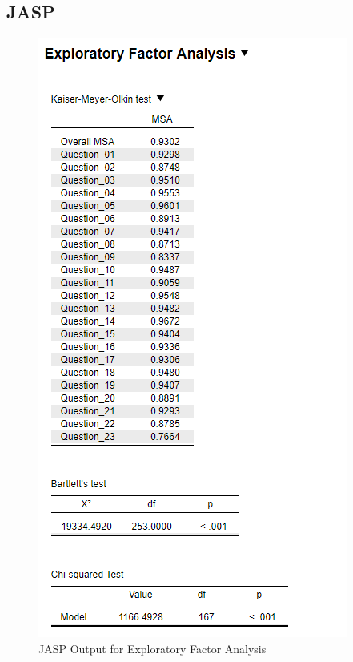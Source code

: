 \documentclass[
]{book}
\begin{document}
\hypertarget{jasp-1}{%
\subsection{JASP}\label{jasp-1}}

\begin{figure}[!h]
\includegraphics{Screenshots/Exploratory Factor Analysis/efaJASP1} \caption{\label{fig:efaJASP}JASP Output for Exploratory Factor Analysis}\label{fig:efaJASP}
\end{figure}
\end{document}
